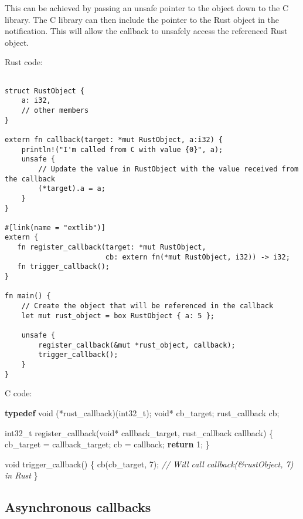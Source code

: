 \documentclass[]{article}
\newenvironment{Shaded}{}{}
\newcommand{\KeywordTok}[1]{\textcolor[rgb]{0.00,0.44,0.13}{\textbf{{#1}}}}
\newcommand{\DataTypeTok}[1]{\textcolor[rgb]{0.56,0.13,0.00}{{#1}}}
\newcommand{\DecValTok}[1]{\textcolor[rgb]{0.25,0.63,0.44}{{#1}}}
\newcommand{\CommentTok}[1]{\textcolor[rgb]{0.38,0.63,0.69}{\textit{{#1}}}}
\newcommand{\NormalTok}[1]{{#1}}
\begin{document}
This can be achieved by passing an unsafe pointer to the object down to
the C library. The C library can then include the pointer to the Rust
object in the notification. This will allow the callback to unsafely
access the referenced Rust object.

Rust code:

\begin{verbatim}

struct RustObject {
    a: i32,
    // other members
}

extern fn callback(target: *mut RustObject, a:i32) {
    println!("I'm called from C with value {0}", a);
    unsafe {
        // Update the value in RustObject with the value received from the callback
        (*target).a = a;
    }
}

#[link(name = "extlib")]
extern {
   fn register_callback(target: *mut RustObject,
                        cb: extern fn(*mut RustObject, i32)) -> i32;
   fn trigger_callback();
}

fn main() {
    // Create the object that will be referenced in the callback
    let mut rust_object = box RustObject { a: 5 };

    unsafe {
        register_callback(&mut *rust_object, callback);
        trigger_callback();
    }
}
\end{verbatim}

C code:

\begin{Shaded}
\begin{Highlighting}[]
\KeywordTok{typedef} \DataTypeTok{void} \NormalTok{(*rust_callback)(}\DataTypeTok{int32_t}\NormalTok{);}
\DataTypeTok{void}\NormalTok{* cb_target;}
\NormalTok{rust_callback cb;}

\DataTypeTok{int32_t} \NormalTok{register_callback(}\DataTypeTok{void}\NormalTok{* callback_target, rust_callback callback) \{}
    \NormalTok{cb_target = callback_target;}
    \NormalTok{cb = callback;}
    \KeywordTok{return} \DecValTok{1}\NormalTok{;}
\NormalTok{\}}

\DataTypeTok{void} \NormalTok{trigger_callback() \{}
  \NormalTok{cb(cb_target, }\DecValTok{7}\NormalTok{); }\CommentTok{// Will call callback(&rustObject, 7) in Rust}
\NormalTok{\}}
\end{Highlighting}
\end{Shaded}

\subsection{Asynchronous callbacks}\label{asynchronous-callbacks}
\end{document}

